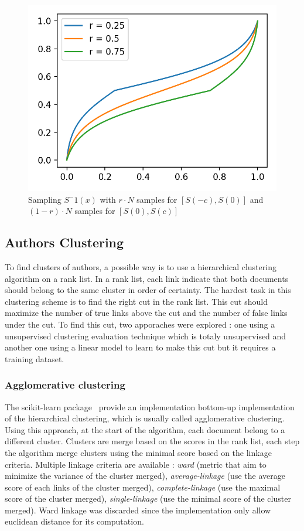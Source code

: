 \begin{figure}
  \includegraphics[width=\linewidth]{img/s_curve_r.png}
  \caption{Sampling $S^-1(x)$ with $r \cdot N$ samples for $\left[S(-c), S(0)\right]$ and $(1-r) \cdot N$ samples for $\left[S(0), S(c)\right]$}
  \label{fig:s_curve_r}
\end{figure}


\subsection{Authors Clustering}

To find clusters of authors, a possible way is to use a hierarchical clustering algorithm on a rank list.
In a rank list, each link indicate that both documents should belong to the same cluster in order of certainty.
The hardest task in this clustering scheme is to find the right cut in the rank list.
This cut should maximize the number of true links above the cut and the number of false links under the cut.
To find this cut, two apporaches were explored : one using a unsupervised clustering evaluation technique which is totaly unsupervised and another one using a linear model to learn to make this cut but it requires a training dataset.

\subsubsection{Agglomerative clustering}

The scikit-learn package~\cite{sklearn} provide an implementation bottom-up implementation of the hierarchical clustering, which is usually called agglomerative clustering.
Using this approach, at the start of the algorithm, each document belong to a different cluster.
Clusters are merge based on the scores in the rank list, each step the algorithm merge clusters using the minimal score based on the linkage criteria.
Multiple linkage criteria are available : \textit{ward} (metric that aim to minimize the variance of the cluster merged), \textit{average-linkage} (use the average score of each links of the cluster merged), \textit{complete-linkage} (use the maximal score of the cluster merged), \textit{single-linkage} (use the minimal score of the cluster merged).
Ward linkage was discarded since the implementation only allow euclidean distance for its computation.

